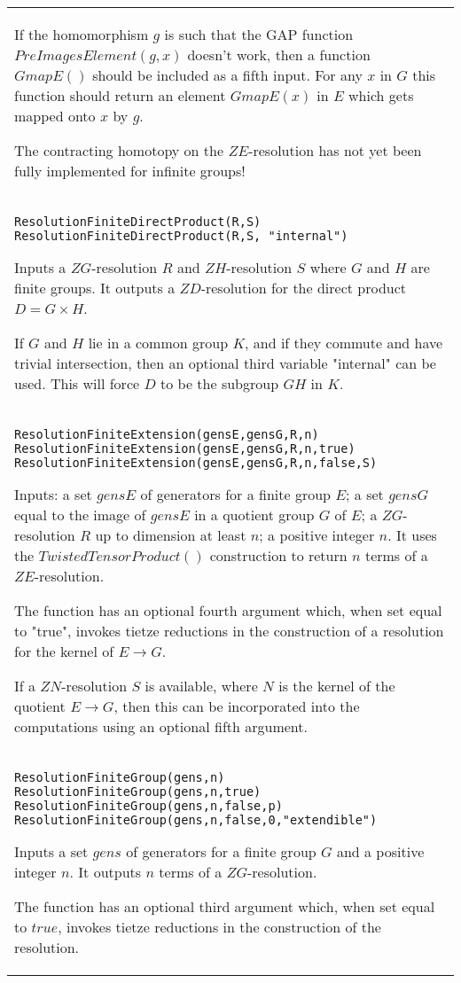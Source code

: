 \documentclass[a4paper,11pt]{report}
\begin{document}
{\begin{center}
\begin{tabular}{|l|}
 If the homomorphism $g$ is such that the GAP function $PreImagesElement(g,x)$ doesn't work, then a function $GmapE()$ should be included as a fifth input. For any $x$ in $G$ this function should return an element $GmapE(x)$ in $E$ which gets mapped onto $x$ by $g$.

 The contracting homotopy on the $ZE$-resolution has not yet been fully implemented for infinite groups! \\
 \index{ResolutionFiniteDirectProduct} \texttt{ResolutionFiniteDirectProduct(R,S) } \texttt{ResolutionFiniteDirectProduct(R,S, "internal")} 

 Inputs a $ZG$-resolution $R$ and $ZH$-resolution $S$ where $G$ and $H$ are finite groups. It outputs a $ZD$-resolution for the direct product $D=G{\ensuremath{\times}}H$.

 If $G$ and $H$ lie in a common group $K$, and if they commute and have trivial intersection, then an optional third
variable "internal" can be used. This will force $D$ to be the subgroup $GH$ in $K$. \\
 \index{ResolutionFiniteExtension} \texttt{ResolutionFiniteExtension(gensE,gensG,R,n)} \texttt{ResolutionFiniteExtension(gensE,gensG,R,n,true) } \texttt{ResolutionFiniteExtension(gensE,gensG,R,n,false,S) } 

 Inputs: a set $gensE$ of generators for a finite group $E$; a set $gensG$ equal to the image of $gensE$ in a quotient group $G$ of $E$; a $ZG$-resolution $R$ up to dimension at least $n$; a positive integer $n$. It uses the $TwistedTensorProduct()$ construction to return $n$ terms of a $ZE$-resolution.

 The function has an optional fourth argument which, when set equal to "true",
invokes tietze reductions in the construction of a resolution for the kernel
of $E \longrightarrow G$.

 If a $ZN$-resolution $S$ is available, where $N$ is the kernel of the quotient $E \longrightarrow G$, then this can be incorporated into the computations using an optional fifth
argument. \\
 \index{ResolutionFiniteGroup} \texttt{ResolutionFiniteGroup(gens,n)} \texttt{ResolutionFiniteGroup(gens,n,true)} \texttt{ResolutionFiniteGroup(gens,n,false,p) } \texttt{ResolutionFiniteGroup(gens,n,false,0,"extendible") } 

 Inputs a set $gens$ of generators for a finite group $G$ and a positive integer $n$. It outputs $n$ terms of a $ZG$-resolution.

 The function has an optional third argument which, when set equal to $true$, invokes tietze reductions in the construction of the resolution. 


\end{tabular}
\end{center}}
\end{document}
